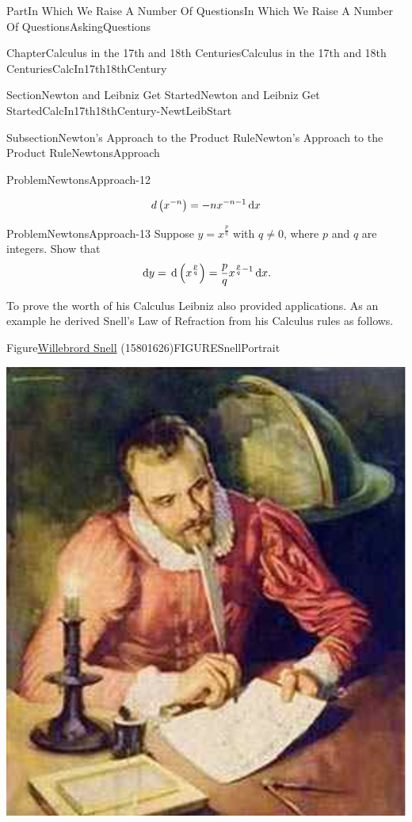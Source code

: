 \documentclass[oneside,10pt,]{book}
\numberwithin{equation}{part}
\newcommand{\dx}[1]{\,{\rm d}#1}
\begin{document}
\begin{partptx}{Part}{In Which We Raise A Number Of Questions}{}{In Which We Raise A Number Of Questions}{}{}{AskingQuestions}
\begin{chapterptx}{Chapter}{Calculus in the 17th and 18th Centuries}{}{Calculus in the 17th and 18th Centuries}{}{}{CalcIn17th18thCentury}
\begin{sectionptx}{Section}{Newton and Leibniz Get Started}{}{Newton and Leibniz Get Started}{}{}{CalcIn17th18thCentury-NewtLeibStart}
\begin{subsectionptx}{Subsection}{Newton's Approach to the Product Rule}{}{Newton's Approach to the Product Rule}{}{}{NewtonsApproach}
\begin{problem}{Problem}{}{NewtonsApproach-12}
\begin{enumerate}[font=\bfseries,label=(\alph*),ref=\alph*]
\begin{equation*}
d\left(x^{-n}\right)=-nx^{-n-1}\dx{x}
\end{equation*}
%
\end{enumerate}%
\end{problem}
\begin{problem}{Problem}{}{NewtonsApproach-13}%
Suppose \(y=x^{\frac{p}{q}}\) with \(q\neq 0\), where \(p\) and \(q\) are integers. Show that%
\begin{equation*}
\dx{y}=\dx{
\left(x^{\frac{p}{q}}\right)}=\frac{p}{q}x^{\frac{p}{q}-1}\dx{
x}\text{.}
\end{equation*}
%
\end{problem}
To prove the worth of his Calculus Leibniz also provided applications.  As an example he derived Snell's Law of Refraction from his Calculus rules as follows.%
\begin{figureptx}{Figure}{\href{https://mathshistory.st-andrews.ac.uk/Biographies/Snell/}{Willebrord Snell} (1580\textendash{}1626)}{FIGURESnellPortrait}{}%
\begin{image}{0.325}{0.35}{0.325}{}%
\includegraphics[width=\linewidth]{external/images/Snell.png}
\end{image}%
\tcblower
\end{figureptx}%

\end{subsectionptx}
\end{sectionptx}
\end{chapterptx}
\end{partptx}
\end{document}

